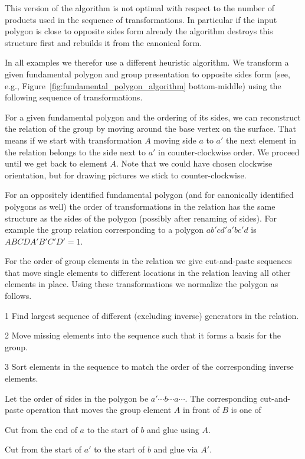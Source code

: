 \documentclass[Thesis]{subfiles}
\begin{document}
This version of the algorithm is not optimal with respect to the number of products used in the sequence of transformations. In particular if the input polygon is close to opposite sides form already the algorithm destroys this structure first and rebuilds it from the canonical form.

In all examples we therefor use a different heuristic algorithm. We transform a given fundamental polygon and group presentation to opposite sides form (see, e.g., Figure~\ref{fig:fundamental_polygon_algorithm} bottom-middle) using the following sequence of transformations.

For a given fundamental polygon and the ordering of its sides, we can reconstruct the relation of the group by moving around the base vertex on the surface. That means if we start with transformation $A$ moving side $a$ to $a'$ the next element in the relation belongs to the side next to $a'$ in counter-clockwise order. We proceed until we get back to element $A$. Note that we could have chosen clockwise orientation, but for drawing pictures we stick to counter-clockwise.

For an oppositely identified fundamental polygon (and for canonically identified polygons as well) the order of transformations in the relation has the same structure as the sides of the polygon (possibly after renaming of sides). For example the group relation corresponding to a polygon $ab'cd'a'bc'd$ is $ABCDA'B'C'D'=1$.

For the order of group elements in the relation we give cut-and-paste sequences that move single elements to different locations in the relation leaving all other elements in place. Using these transformations we normalize the polygon as follows.

\begin{compactitem}
\item[1] Find largest sequence of different (excluding inverse) generators in the relation.
\item[2] Move missing elements into the sequence such that it forms a basis for the group.
\item[3] Sort elements in the sequence to match the order of the corresponding inverse elements.
\end{compactitem}

Let the order of sides in the polygon be $a' \cdots b \cdots a \cdots$. The corresponding cut-and-paste operation that moves the group element $A$ in front of $B$ is one of

\begin{compactitem}
\item Cut from the end of $a$ to the start of $b$ and glue using $A$.
\item Cut from the start of $a'$ to the start of $b$ and glue via $A'$.
\end{compactitem}
\end{document}
